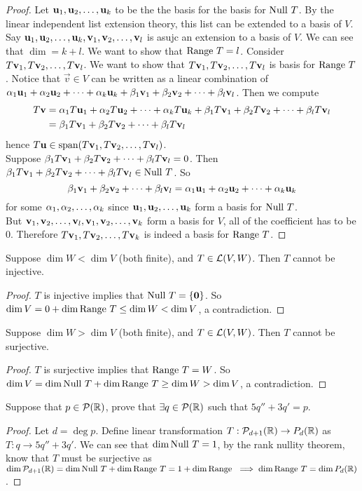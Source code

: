 \begin{proof}
    Let $\li{\vec u}k$ to be the the basis for the basis for $\nul T$. By the linear independent list extension theory, this list can be extended to a basis of $V$. Say $\li{\vec u}k, \li{\vec v}l$ is asujc an extension to a basis of $V$. We can see that $\dim = k + l$. We want to show that $\range T = l$. Consider $\li{T \vec v}l$. We want to show that $\li{T \vec v}l$ is basis for $\range T$. Notice that $\vec v \in V$ can be written as a linear combination of $\lincomb{\alpha}{\vec u}{k} + \lincomb{\beta}{\vec v}{l}$. Then we compute \begin{align*}T\vec v &= \lincomb{\alpha}{T\vec u}{k} + \lincomb{\beta}{T\vec v}{l} \\ &= \lincomb{\beta}{T\vec v}{l} \end{align*} hence $T\vec u \in \spa (\li{T\vec v}{l})$. \\
    Suppose $\lincomb{\beta}{T\vec v}{l} = 0$. Then $\lincomb{\beta}{T\vec v}{l} \in \nul T$. So \[\lincomb{\beta}{\vec v}{l} = \lincomb{\alpha}{\vec u}{k}\] for some $\li{\alpha}{k}$ since $\li{\vec u}k$ form a basis for $\nul T$. \\
    But $\li {\vec v}l, \li{\vec v}k$ form a basis for $V$, all of the coefficient has to be $0$. Therefore $\li{T\vec v}k$ is indeed a basis for $\range T$.
\end{proof}
\begin{example}
    Suppose $\dim W < \dim V$ (both finite), and $T \in \c L(V,W)$. Then $T$ cannot be injective.
\end{example}
\begin{proof}
    $T$ is injective implies that $\nul T = \lb \vec 0 \rb$. So $\dim V = 0 + \dim \range T \leq \dim W < \dim V$, a contradiction. 
\end{proof}
\begin{example}
    Suppose $\dim W > \dim V$ (both finite), and $T \in \c L(V,W)$. Then $T$  cannot be surjective.
\end{example}
\begin{proof}
    $T$ is surjective implies that $\range T = W$. So $\dim V = \dim \nul T + \dim \range T \geq \dim W > \dim V$, a contradiction. 
\end{proof}
\begin{example}
    Suppose that $p \in \c P(\b R)$, prove that $\exists q \in \c P(\b R)$ such that $5q'' + 3q' = p$. \\
\end{example}
\begin{proof}
    Let $d = \deg p$. Define linear transformation $T: \c P_{d +1}(\b R) \to P_d(\b R)$ as $T: q \to 5q''  +3q'$. We can see that $\dim \nul T  = 1$, by the rank nullity theorem, know that $T$ must be surjective as $\dim \c P_{d+1}(\b R) = \dim \nul T + \dim \range T = 1 + \dim \range \implies \dim \range T = \dim P_d(\b R)$.
\end{proof}
